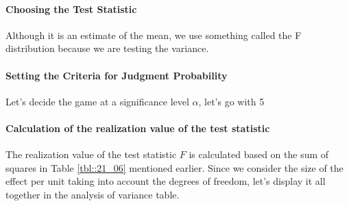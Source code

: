 \documentclass{ltjbook}
\begin{document}
\paragraph{Choosing the Test Statistic} Although it is an estimate of the mean, we use something called the F distribution because we are testing the variance.
\paragraph{Setting the Criteria for Judgment Probability} Let's decide the game at a significance level $\alpha$, let's go with 5%
\paragraph{Calculation of the realization value of the test statistic} The realization value of the test statistic $F$ is calculated based on the sum of squares in Table \ref{tbl::21_06} mentioned earlier. Since we consider the size of the effect per unit taking into account the degrees of freedom, let's display it all together in the analysis of variance table.
\end{document}
